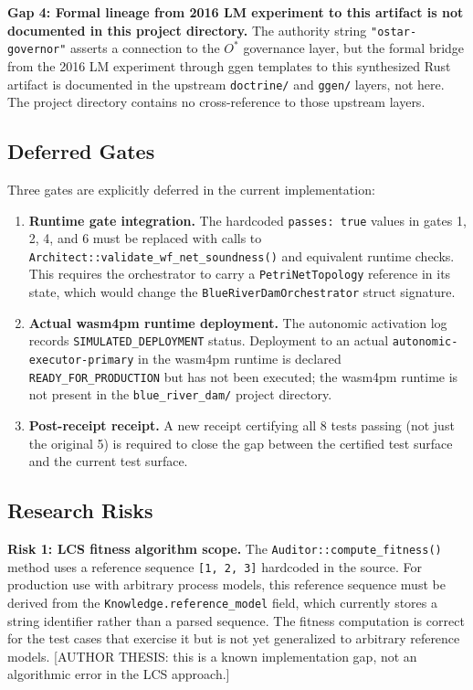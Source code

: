 \textbf{Gap 4: Formal lineage from 2016 LM experiment to this artifact is not
documented in this project directory.}
The authority string \texttt{"ostar-governor"} asserts a connection to the
$O^*$ governance layer, but the formal bridge from the 2016 LM experiment
through ggen templates to this synthesized Rust artifact is documented in the
upstream \texttt{doctrine/} and \texttt{ggen/} layers, not here. The project
directory contains no cross-reference to those upstream layers.

\subsection{Deferred Gates}
\label{sec:blue-river-dam-questions-deferred}

Three gates are explicitly deferred in the current implementation:

\begin{enumerate}
  \item \textbf{Runtime gate integration.} The hardcoded \texttt{passes: true}
    values in gates 1, 2, 4, and 6 must be replaced with calls to
    \texttt{Architect::validate\_wf\_net\_soundness()} and equivalent runtime
    checks. This requires the orchestrator to carry a \texttt{PetriNetTopology}
    reference in its state, which would change the \texttt{BlueRiverDamOrchestrator}
    struct signature.
  \item \textbf{Actual wasm4pm runtime deployment.} The autonomic activation log
    records \texttt{SIMULATED\_DEPLOYMENT} status. Deployment to an actual
    \texttt{autonomic-executor-primary} in the wasm4pm runtime is declared
    \texttt{READY\_FOR\_PRODUCTION} but has not been executed; the wasm4pm
    runtime is not present in the \texttt{blue\_river\_dam/} project directory.
  \item \textbf{Post-receipt receipt.} A new receipt certifying all 8 tests
    passing (not just the original 5) is required to close the gap between the
    certified test surface and the current test surface.
\end{enumerate}

\subsection{Research Risks}
\label{sec:blue-river-dam-questions-risks}

\textbf{Risk 1: LCS fitness algorithm scope.}
The \texttt{Auditor::compute\_fitness()} method uses a reference sequence
\texttt{[1, 2, 3]} hardcoded in the source. For production use with arbitrary
process models, this reference sequence must be derived from the
\texttt{Knowledge.reference\_model} field, which currently stores a string
identifier rather than a parsed sequence. The fitness computation is correct
for the test cases that exercise it but is not yet generalized to arbitrary
reference models. [AUTHOR THESIS: this is a known implementation gap, not an
algorithmic error in the LCS approach.]

